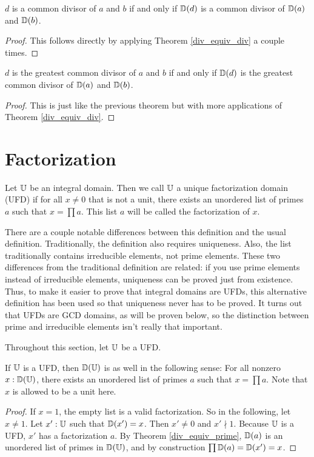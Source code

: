 \documentclass[../../math.tex]{subfiles}
\begin{document}
\begin{theorem} \label{div_equiv_common_divisor}
    $d$ is a common divisor of $a$ and $b$ if and only if $\mathbb{D}(d)$ is a common
    divisor of $\mathbb{D}(a)$ and $\mathbb{D}(b)$.
\end{theorem}
\begin{proof}
    This follows directly by applying Theorem \ref{div_equiv_div} a couple
    times.
\end{proof}

\begin{theorem} \label{div_equiv_gcd}
    $d$ is the greatest common divisor of $a$ and $b$ if and only if $\mathbb{D}(d)$ is
    the greatest common divisor of $\mathbb{D}(a)$ and $\mathbb{D}(b)$.
\end{theorem}
\begin{proof}
    This is just like the previous theorem but with more applications of Theorem
    \ref{div_equiv_div}.
\end{proof}

\section{Factorization}

\begin{class}
    Let $\mathbb{U}$ be an integral domain.  Then we call $\mathbb{U}$ a unique factorization
    domain (UFD) if for all $x \neq 0$ that is not a unit, there exists an
    unordered list of primes $a$ such that $x = \prod a$.  This list $a$ will be
    called the factorization of $x$.
\end{class}

There are a couple notable differences between this definition and the usual
definition.  Traditionally, the definition also requires uniqueness.  Also, the
list traditionally contains irreducible elements, not prime elements.  These two
differences from the traditional definition are related: if you use prime
elements instead of irreducible elements, uniqueness can be proved just from
existence.  Thus, to make it easier to prove that integral domains are UFDs,
this alternative definition has been used so that uniqueness never has to be
proved.  It turns out that UFDs are GCD domains, as will be proven below, so the
distinction between prime and irreducible elements isn't really that important.

Throughout this section, let $\mathbb{U}$ be a UFD.

\begin{theorem} \label{div_factorization_base}
    If $\mathbb{U}$ is a UFD, then $\mathbb{D}(\mathbb{U})$ is as well in the following sense: For all
    nonzero $x : \mathbb{D}(\mathbb{U})$, there exists an unordered list of primes $a$ such that
    $x = \prod a$.  Note that $x$ is allowed to be a unit here.
\end{theorem}
\begin{proof}
    If $x = 1$, the empty list is a valid factorization.  So in the following,
    let $x \neq 1$.  Let $x' : \mathbb{U}$ such that $\mathbb{D}(x') = x$.  Then $x' \neq 0$ and
    $x' \nmid 1$.  Because $\mathbb{U}$ is a UFD, $x'$ has a factorization $a$.  By
    Theorem \ref{div_equiv_prime}, $\mathbb{D}(a)$ is an unordered list of primes in
    $\mathbb{D}(\mathbb{U})$, and by construction $\prod \mathbb{D}(a) = \mathbb{D}(x') = x$.
\end{proof}
\end{document}
